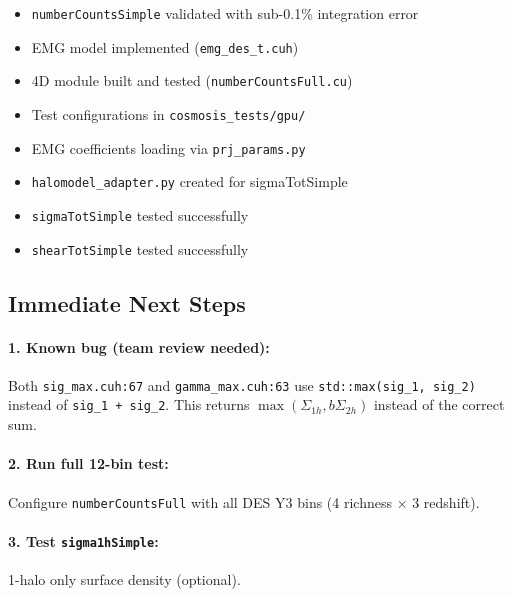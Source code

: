 \documentclass[a4paper, 11pt]{article}
\newcommand{\filepath}[1]{{\small\texttt{#1}}}
\begin{document}
\begin{itemize}
  \item[\textcolor{green!50!black}{$\checkmark$}] \texttt{numberCountsSimple} validated with sub-0.1\% integration error
  \item[\textcolor{green!50!black}{$\checkmark$}] EMG model implemented (\texttt{emg\_des\_t.cuh})
  \item[\textcolor{green!50!black}{$\checkmark$}] 4D module built and tested (\texttt{numberCountsFull.cu})
  \item[\textcolor{green!50!black}{$\checkmark$}] Test configurations in \filepath{cosmosis\_tests/gpu/}
  \item[\textcolor{green!50!black}{$\checkmark$}] EMG coefficients loading via \texttt{prj\_params.py}
  \item[\textcolor{green!50!black}{$\checkmark$}] \texttt{halomodel\_adapter.py} created for sigmaTotSimple
  \item[\textcolor{green!50!black}{$\checkmark$}] \texttt{sigmaTotSimple} tested successfully
  \item[\textcolor{green!50!black}{$\checkmark$}] \texttt{shearTotSimple} tested successfully
\end{itemize}

\subsection{Immediate Next Steps}

\paragraph{1. Known bug (team review needed):} Both \texttt{sig\_max.cuh:67} and \texttt{gamma\_max.cuh:63} use \texttt{std::max(sig\_1, sig\_2)} instead of \texttt{sig\_1 + sig\_2}. This returns $\max(\Sigma_{1h}, b\Sigma_{2h})$ instead of the correct sum.

\paragraph{2. Run full 12-bin test:}
Configure \texttt{numberCountsFull} with all DES Y3 bins (4 richness $\times$ 3 redshift).

\paragraph{3. Test \texttt{sigma1hSimple}:} 1-halo only surface density (optional).
\end{document}
